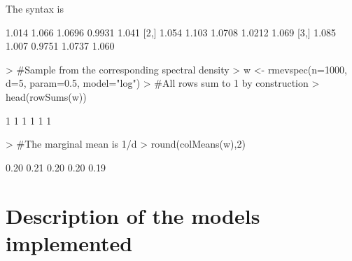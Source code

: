 \documentclass{article}
\begin{document}
The syntax is 
\begin{Schunk}
\begin{Soutput}
      [,1]  [,2]   [,3]   [,4]  [,5]
[1,] 1.014 1.066 1.0696 0.9931 1.041
[2,] 1.054 1.103 1.0708 1.0212 1.069
[3,] 1.085 1.007 0.9751 1.0737 1.060
\end{Soutput}
\begin{Sinput}
> #Sample from the corresponding spectral density
> w <- rmevspec(n=1000, d=5, param=0.5, model="log")
> #All rows sum to 1 by construction
> head(rowSums(w))
\end{Sinput}
\begin{Soutput}
[1] 1 1 1 1 1 1
\end{Soutput}
\begin{Sinput}
> #The marginal mean is 1/d
> round(colMeans(w),2)
\end{Sinput}
\begin{Soutput}
[1] 0.20 0.21 0.20 0.20 0.19
\end{Soutput}
\end{Schunk}

\section{Description of the models implemented}
\end{document}
